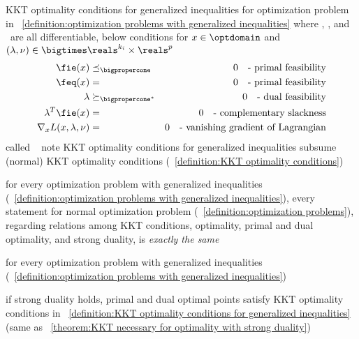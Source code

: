 \documentclass[17pt,landscape]{foils}
\begin{document}
{\begin{mydefinition}{KKT optimality conditions for generalized inequalities}
	for optimization problem in ~\ref{definition:optimization problems with generalized inequalities}
	where \fobj, \fie, and \feq\ are all differentiable,
	below conditions
	for ${x}\in\optdomain$ and $({\lambda}, {\nu})\in\bigtimes \reals^{k_i} \times\reals^p$
	\begin{eqnarray*}
		\fie({x})
			&\preceq_\bigpropercone&
		0
		\quad
		\mbox{- primal feasibility}
		\\
		\feq(x)
			&=&
		0
		\quad
		\mbox{- primal feasibility}
		\\
		\lambda
			&\succeq_{\bigpropercone^\ast}&
		0
		\quad
		\mbox{- dual feasibility}
		\\
		{\lambda}^T \fie({x})
			&=&
		0
		\quad
		\mbox{- complementary slackness}
		\\
		\nabla_x L(x,\lambda,\nu)
			&=&
		0
		\quad
		\mbox{- vanishing gradient of Lagrangian}
	\end{eqnarray*}
	called 
	\shrinkspacewithintheoremslike\
	\ibit
	\iitem
		note KKT optimality conditions for generalized inequalities
		subsume
		(normal) KKT optimality conditions
		(~\ref{definition:KKT optimality conditions})
	\eit
\end{mydefinition}



\bit
\item
	for every optimization problem with generalized inequalities
	(~\ref{definition:optimization problems with generalized inequalities}),
	every statement for normal optimization problem
	(~\ref{definition:optimization problems}),
	regarding relations among
	KKT conditions,
	optimality,
	primal and dual optimality,
	and
	strong duality,
	is \emph{exactly the same}

	\bit
	\vitem
		for every optimization problem with generalized inequalities
		(~\ref{definition:optimization problems with generalized inequalities})

		\bit
		\viitem
			if strong duality holds,
			primal and dual optimal points satisfy KKT optimality conditions
			in ~\ref{definition:KKT optimality conditions for generalized inequalities}
			(same as \theoremname~\ref{theorem:KKT necessary for optimality with strong duality})

}
\end{document}
